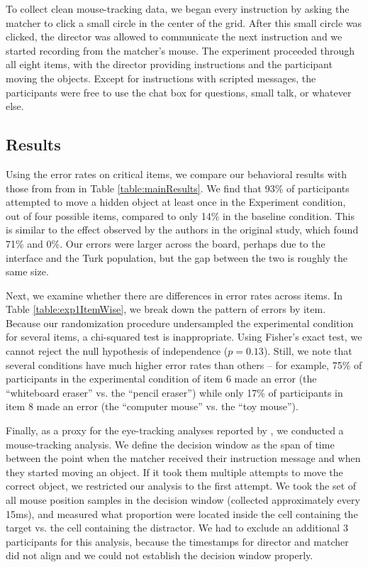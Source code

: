 \documentclass[10pt,letterpaper]{article}
\begin{document}
To collect clean mouse-tracking data, we began every instruction by asking the matcher to click a small circle in the center of the grid. After this small circle was clicked, the director was allowed to communicate the next instruction and we started recording from the matcher's mouse. The experiment proceeded through all eight items, with the director providing instructions and the participant moving the objects. Except for instructions with scripted messages, the participants were free to use the chat box for questions, small talk, or whatever else.

\subsection{Results}

Using the error rates on critical items, we compare our behavioral results with those from from  in Table \ref{table:mainResults}. We find that 93\% of participants attempted to move a hidden object at least once in the Experiment condition, out of four possible items, compared to only 14\% in the baseline condition. This is similar to the effect observed by the authors in the original study, which found 71\% and 0\%. Our errors were larger across the board, perhaps due to the interface and the Turk population, but the gap between the two is roughly the same size.

Next, we examine whether there are differences in error rates across items. In Table \ref{table:exp1ItemWise}, we break down the pattern of errors by item. Because our randomization procedure undersampled the experimental condition for several items, a chi-squared test is inappropriate. Using Fisher's exact test, we cannot reject the null hypothesis of independence ($p = 0.13$). Still, we note that several conditions have much higher error rates than others -- for example, 75\% of participants in the experimental condition of item 6 made an error (the ``whiteboard eraser'' vs. the ``pencil eraser'') while only 17\% of participants in item 8 made an error (the ``computer mouse'' vs. the ``toy mouse''). 

Finally, as a proxy for the eye-tracking analyses reported by , we conducted a mouse-tracking analysis. We define the decision window as the span of time between the point when the matcher received their instruction message and when they started moving an object. If it took them multiple attempts to move the correct object, we restricted our analysis to the first attempt. We took the set of all mouse position samples in the decision window (collected approximately every 15ms), and measured what proportion were located inside the cell containing the target vs. the cell containing the distractor.  We had to exclude an additional 3 participants for this analysis, because the timestamps for director and matcher did not align and we could not establish the decision window properly.
\end{document}
